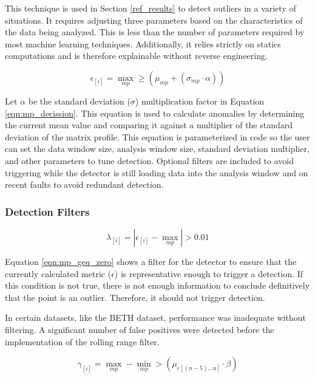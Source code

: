 This technique is used in Section \ref{ref_results} to detect outliers in a variety of situations.
It requires adjusting three parameters based on the characteristics of the data being analyzed.
This is less than the number of parameters required by most machine learning techniques.
Additionally, it relies strictly on statics computations and is therefore explainable without reverse engineering.

\begin{equation}
    \label{eqn:mp_decission}
    \epsilon_{[i]} = \max_{mp} \geq \left(\mu_{mp} + \left(\sigma_{mp} \cdot \alpha\right)\right)
\end{equation}

Let $\alpha$ be the standard deviation ($\sigma$) multiplication factor in Equation \eqref{eqn:mp_decission}.
This equation is used to calculate anomalies by determining the current mean value and comparing it against a multiplier of the standard deviation of the matrix profile.
This equation is parameterized in code so the user can set the data window size, analysis window size, standard deviation multiplier, and other parameters to tune detection.
Optional filters are included to avoid triggering while the detector is still loading data into the analysis window and on recent faults to avoid redundant detection.

\subsubsection{Detection Filters}

\begin{equation}
    \label{eqn:mp_geq_zero}
    \lambda_{[i]} = \left| \epsilon_{[i]} - \max_{mp} \right| > 0.01
\end{equation}

Equation \eqref{eqn:mp_geq_zero} shows a filter for the detector to ensure that the currently calculated metric ($\epsilon$) is representative enough to trigger a detection.
If this condition is not true, there is not enough information to conclude definitively that the point is an outlier.
Therefore, it should not trigger detection.

In certain datasets, like the BETH dataset, performance was inadequate without filtering.
A significant number of false positives were detected before the implementation of the rolling range filter.

\begin{equation}
    \label{eqn:mp_rolling_range}
    \gamma_{[i]} = \max_{mp} - \min_{mp} > \left(\mu_{\epsilon[(n-5)...n]} \cdot \beta \right)
\end{equation}

